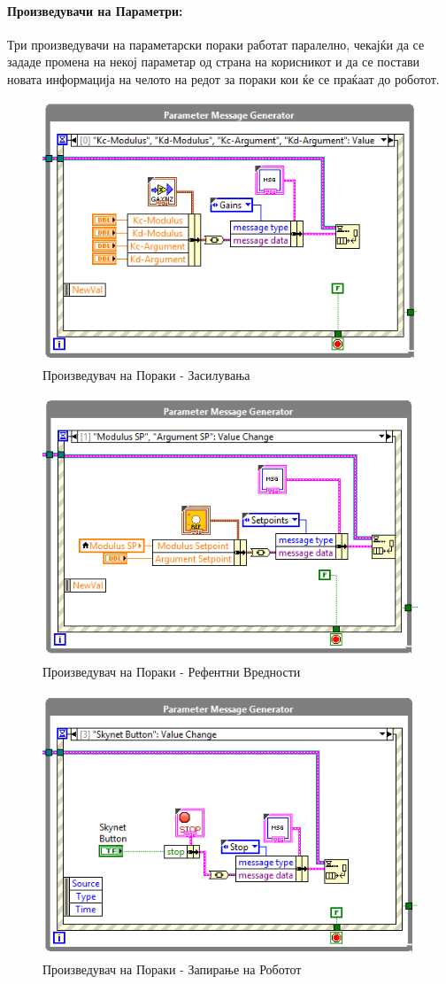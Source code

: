 \documentclass[12pt]{article}
\begin{document}
    \paragraph{Произведувачи на Параметри:\\}
      Три произведувачи на параметарски пораки работат паралелно, чекајќи да се зададе промена на некој параметар од страна на корисникот и да се постави новата информација на челото на редот за пораки кои ќе се праќаат до роботот.
      \begin{figure}[H]
          \centering
          \includegraphics[width=0.75\linewidth]{./images/gain_message_generator.png}
          \caption{Произведувач на Пораки - Засилувања}
          \end{figure}
      \begin{figure}[H]
          \centering
          \includegraphics[width=0.75\linewidth]{./images/setpoint_message_generator.png}
          \caption{Произведувач на Пораки - Рефентни Вредности}
          \end{figure}
      \begin{figure}[H]
          \centering
          \includegraphics[width=0.75\linewidth]{./images/robot_stop_generator.png}
          \caption{Произведувач на Пораки - Запирање на Роботот}
          \end{figure}
\end{document}
